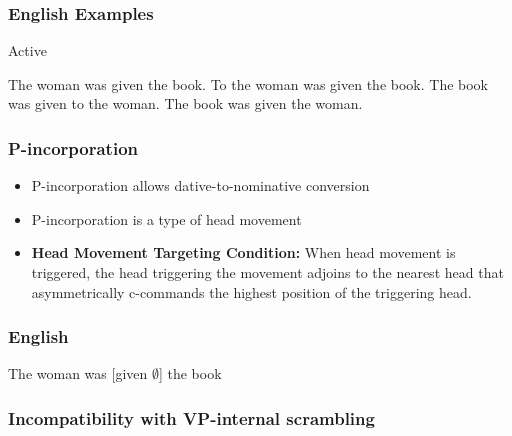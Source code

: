 \documentclass{beamer}
\begin{document}
\begin{frame}
	\frametitle{English Examples}
\begin{exe}
	\ex Active
	\begin{xlist}
		\ex The woman was given the book.
		\ex To the woman was given the book.
		\ex The book was given to the woman.
		\ex The book was given the woman.
	\end{xlist}
\end{exe}
\end{frame}

\begin{frame}
	\frametitle{P-incorporation}
	\begin{itemize}
		\item P-incorporation allows dative-to-nominative conversion \citep{Alexiadou.2014}
		\item P-incorporation is a type of head movement
	 	\item \textbf{Head Movement Targeting Condition:} When head movement is triggered, the head triggering the movement adjoins to the nearest head that asymmetrically c-commands the highest position of the triggering head. \label{ex:headmovement}
	\end{itemize}
 \end{frame}

 \begin{frame}
	\frametitle{English}
	\vfill
	The woman was [given $\emptyset$] the book
	\vfill
\end{frame}

 \begin{frame}
	 \frametitle{Incompatibility with VP-internal scrambling}
\end{frame}
\end{document}
